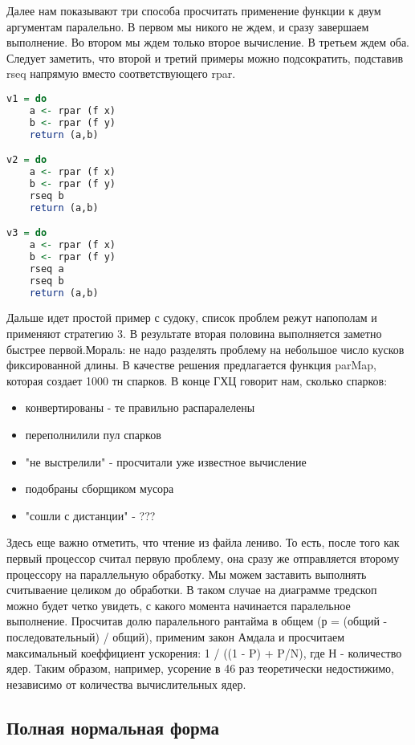 \documentclass[12pt,a4paper]{article}
\begin{document}
Далее нам показывают три способа просчитать применение функции к двум аргументам паралельно. В первом мы никого не ждем, и сразу завершаем выполнение. Во втором мы ждем только второе вычисление. В третьем ждем оба. Следует заметить, что второй и третий примеры можно подсократить, подставив rseq напрямую вместо соответствующего rpar. 


\begin{lstlisting}[language=Haskell]
v1 = do
	a <- rpar (f x)
	b <- rpar (f y)
	return (a,b)

v2 = do
	a <- rpar (f x)
	b <- rpar (f y)
	rseq b
	return (a,b)

v3 = do
	a <- rpar (f x)
	b <- rpar (f y)
	rseq a
	rseq b
	return (a,b)

\end{lstlisting}

Дальше идет простой пример с судоку, список проблем режут напополам и применяют стратегию 3. В результате вторая половина выполняется заметно быстрее первой.Мораль: не надо разделять проблему на небольшое число кусков фиксированной длины. В качестве решения предлагается функция parMap, которая создает 1000 тн спарков. В конце  ГХЦ говорит нам, сколько спарков:
\begin{itemize}
\item конвертированы - те правильно распаралелены
\item переполнилили пул спарков
\item "не выстрелили" - просчитали уже известное вычисление
\item подобраны сборщиком мусора
\item "сошли с дистанции" - ???
\end{itemize}

Здесь еще важно отметить, что чтение из файла лениво. То есть, после того как первый процессор считал первую проблему, она сразу же отправляется второму процессору на параллельную обработку. Мы можем заставить выполнять считываение целиком до обработки. В таком случае на диаграмме тредскоп можно будет четко увидеть, с какого момента начинается паралельное выполнение. Просчитав долю паралельного рантайма в общем (р = (общий - последовательный) / общий), применим закон Амдала и просчитаем максимальный коеффициент ускорения: 1 / ((1 - P) + P/N), где Н -  количество ядер. Таким образом, например, усорение в 46 раз теоретически недостижимо, независимо от количества вычислительных ядер.\\

\subsection{Полная нормальная форма}
\end{document}

